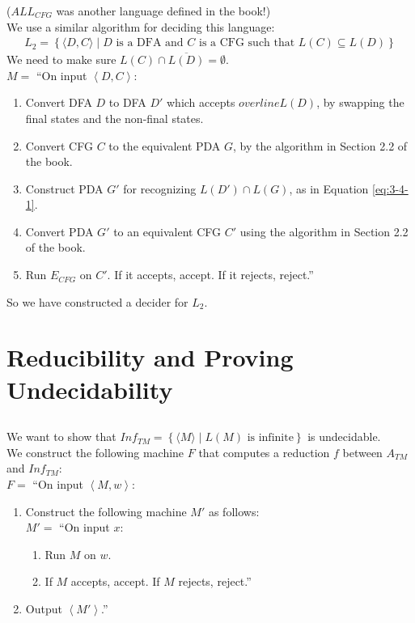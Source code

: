 \documentclass{article}
\begin{document}
\subsubsection{}
(\(ALL_{CFG}\) was another language defined in the book!)\\
We use a similar algorithm for deciding this language:
\begin{align*}
L_2 = \left\{\langle D, C\rangle \mid D \text{ is a DFA and } C \text{ is a CFG such that } L(C) \subseteq L(D)\right\}
\end{align*}
We need to make sure \(L(C) \cap \overline{L(D)} = \emptyset\).\\[7pt]
\(M = \) ``On input \(\left\langle D, C\right\rangle\):
\begin{enumerate}
\item Convert DFA \(D\) to DFA \(D'\) which accepts \(overline{L(D)}\), by swapping the final states and the non-final states.
\item Convert CFG \(C\) to the equivalent PDA \(G\), by the algorithm in Section 2.2 of the book.
\item Construct PDA \(G'\) for recognizing \(L(D')\cap L(G)\), as in Equation \eqref{eq:3-4-1}.
\item Convert PDA \(G'\) to an equivalent CFG \(C'\) using the algorithm in Section 2.2 of the book.
\item Run \(E_{CFG}\) on \(C'\). If it accepts, accept. If it rejects, reject.''
\end{enumerate}

So we have constructed a decider for \(L_2\).

\section{Reducibility and Proving Undecidability}

\subsection{}
\subsubsection{}
We want to show that \(Inf_{TM} = \left\{\langle M\rangle\mid L(M) \text{ is infinite}\right\}\) is undecidable.\\
We construct the following machine \(F\) that computes a reduction \(f\) between \(A_{TM}\) and \(Inf_{TM}\):\\[7pt]
\(F = \) ``On input \(\left\langle M, w\right\rangle\):
\begin{enumerate}
\item Construct the following machine \(M'\) as follows:\\
\(M' = \) ``On input \(x\):
\begin{enumerate}[label=\(\arabic*.\)]
\item Run \(M\) on \(w\).
\item If \(M\) accepts, accept. If \(M\) rejects, reject.''
\end{enumerate}
\item  Output \(\left\langle M'\right\rangle\).''
\end{enumerate}
\end{document}
